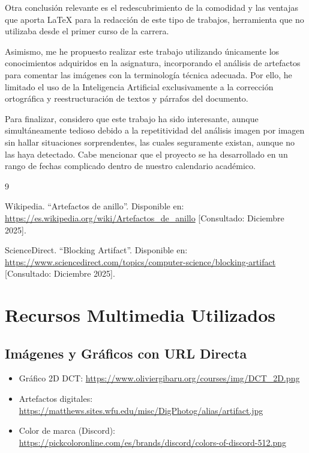 \documentclass[a4paper, 12pt]{article}
\begin{document}
Otra conclusión relevante es el redescubrimiento de la comodidad y las ventajas que aporta \LaTeX{} para la redacción de este tipo de trabajos, herramienta que no utilizaba desde el primer curso de la carrera.

Asimismo, me he propuesto realizar este trabajo utilizando únicamente los conocimientos adquiridos en la asignatura, incorporando el análisis de artefactos para comentar las imágenes con la terminología técnica adecuada. Por ello, he limitado el uso de la Inteligencia Artificial exclusivamente a la corrección ortográfica y reestructuración de textos y párrafos del documento.

Para finalizar, considero que este trabajo ha sido interesante, aunque simultáneamente tedioso debido a la repetitividad del análisis imagen por imagen sin hallar situaciones sorprendentes, las cuales seguramente existan, aunque no las haya detectado. Cabe mencionar que el proyecto se ha desarrollado en un rango de fechas complicado dentro de nuestro calendario académico.


\newpage
\begin{thebibliography}{9}

     Wikipedia. ``Artefactos de anillo''. Disponible en: \url{https://es.wikipedia.org/wiki/Artefactos_de_anillo} [Consultado: Diciembre 2025].
    
     ScienceDirect. ``Blocking Artifact''. Disponible en: \url{https://www.sciencedirect.com/topics/computer-science/blocking-artifact} [Consultado: Diciembre 2025].

\end{thebibliography}

\section*{Recursos Multimedia Utilizados}

\subsection*{Imágenes y Gráficos con URL Directa}
\begin{itemize}
    \item Gráfico 2D DCT: \url{https://www.oliviergibaru.org/courses/img/DCT_2D.png}
    \item Artefactos digitales: \url{https://matthews.sites.wfu.edu/misc/DigPhotog/alias/artifact.jpg}
    \item Color de marca (Discord): \url{https://pickcoloronline.com/es/brands/discord/colors-of-discord-512.png}
\end{itemize}
\end{document}
